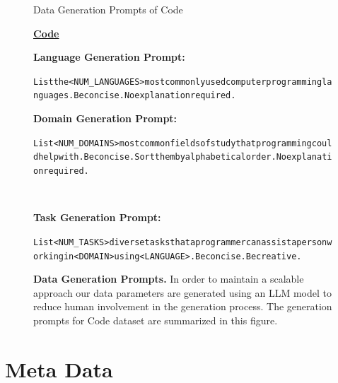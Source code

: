 \begin{figure}[h]
	\begin{AIBox}{Data Generation Prompts of Code}
		\parbox[h]{0.5\textwidth}{{\bf \underline{Code} }\\

			\parbox[h]{0.5\textwidth}{{\small \bf Language Generation Prompt:} \scriptsize\begin{alltt}
					List the <NUM\_LANGUAGES> most commonly used computer programming languages. Be concise. No explanation required.
				\end{alltt}}%
			\parbox[h]{0.5\textwidth}{{\small \bf Domain Generation Prompt:} \scriptsize\begin{alltt}
					List <NUM\_DOMAINS> most common fields of study that programming could help with. Be concise. Sort them by alphabetical order. No explanation required.
				\end{alltt}}\\

			\parbox[h]{1\textwidth}{{\small \bf Task Generation Prompt:} \scriptsize\begin{alltt}
					List <NUM\_TASKS> diverse tasks that a programmer can assist a person working in <DOMAIN> using <LANGUAGE>. Be concise. Be creative.
				\end{alltt}
			}}


	\end{AIBox}
	\caption{\textbf{Data Generation Prompts.} In order to maintain a scalable approach our data parameters are generated using an LLM model to reduce human involvement in the generation process. The generation prompts for Code dataset are summarized in this figure.}
	\label{fig:generation_prompts}
\end{figure}

\clearpage

\section{Meta Data}

